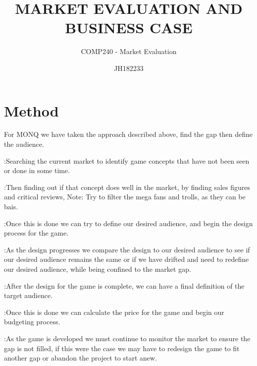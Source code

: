 \documentclass{scrartcl}
\title{MARKET EVALUATION AND BUSINESS CASE}
\subtitle{COMP240 - Market Evaluation}
\author{JH182233}
\begin{document}
	
	
	\maketitle
{}
	
\section{Method}
For MONQ we have taken the approach described above, find the gap then define the audience. 
\newline

:Searching the current market to identify game concepts that have not been  seen or done in some time.

:Then finding out if that concept does well in the market, by finding sales  figures and critical reviews, Note: Try to filter the mega fans and trolls,  as they can be bais.  

:Once this is done we can try to define our desired audience, and begin the  design process for the game.

:As the design progresses we compare the design to our desired audience to  see if our desired audience remains the same or if we have drifted and need  to redefine our desired audience, while being confined to the market gap.

:After the design for the game is complete, we can have a final definition  of the target audience.

:Once this is done we can calculate the price for the game and begin our  budgeting process.

:As the game is developed we must continue to monitor the market to ensure the gap is not filled, if this were the case we may have to redesign the game to fit another gap or abandon the project to start anew. 
\end{document}
